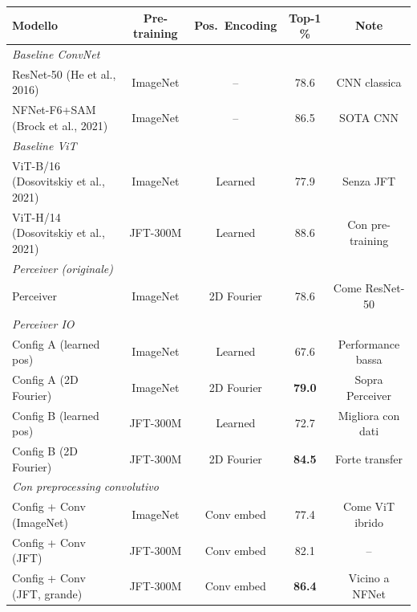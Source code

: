 \documentclass[12pt,a4paper]{article}
\begin{document}
\begin{center}
\begin{tabular}{lcccc}
\toprule
\textbf{Modello} & \textbf{Pre-training} & \textbf{Pos.\ Encoding} & \textbf{Top-1 \%} & \textbf{Note} \\
\midrule
\multicolumn{5}{l}{\textit{Baseline ConvNet}} \\
ResNet-50 (He et al., 2016) & ImageNet & -- & 78.6 & CNN classica \\
NFNet-F6+SAM (Brock et al., 2021) & ImageNet & -- & 86.5 & SOTA CNN \\
\midrule
\multicolumn{5}{l}{\textit{Baseline ViT}} \\
ViT-B/16 (Dosovitskiy et al., 2021) & ImageNet & Learned & 77.9 & Senza JFT \\
ViT-H/14 (Dosovitskiy et al., 2021) & JFT-300M & Learned & 88.6 & Con pre-training \\
\midrule
\multicolumn{5}{l}{\textit{Perceiver (originale)}} \\
Perceiver & ImageNet & 2D Fourier & 78.6 & Come ResNet-50 \\
\midrule
\multicolumn{5}{l}{\textit{Perceiver IO}} \\
Config A (learned pos) & ImageNet & Learned & 67.6 & Performance bassa \\
Config A (2D Fourier) & ImageNet & 2D Fourier & \textbf{79.0} & Sopra Perceiver \\
Config B (learned pos) & JFT-300M & Learned & 72.7 & Migliora con dati \\
Config B (2D Fourier) & JFT-300M & 2D Fourier & \textbf{84.5} & Forte transfer \\
\midrule
\multicolumn{5}{l}{\textit{Con preprocessing convolutivo}} \\
Config + Conv (ImageNet) & ImageNet & Conv embed & 77.4 & Come ViT ibrido \\
Config + Conv (JFT) & JFT-300M & Conv embed & 82.1 & -- \\
Config + Conv (JFT, grande) & JFT-300M & Conv embed & \textbf{86.4} & Vicino a NFNet \\
\bottomrule
\end{tabular}
\end{center}
\end{document}
